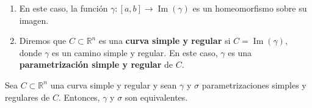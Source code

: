 \begin{observación}
\begin{enumerate}
    \vspace{-2.5em}
    \item En este caso, la función \( \gamma: [a,b] \to \operatorname{Im}(\gamma) \) es
          un homeomorfismo sobre su imagen.
    \item Diremos que \( C \subset \mathbb{R}^n \) es una \textbf{curva simple y regular}
          si \( C = \operatorname{Im}(\gamma) \), donde \( \gamma \) es un camino simple
          y regular. En este caso, \( \gamma \) es una \textbf{parametrización simple y
              regular} de \( C \).
\end{enumerate}
\end{observación}


\begin{teorema}
    Sea \( C \subset \mathbb{R}^n \) una curva simple y regular y sean \( \gamma \) y \( \sigma \) parametrizaciones simples y regulares de \( C \). Entonces, \( \gamma \) y \( \sigma \) son equivalentes.
\end{teorema}

